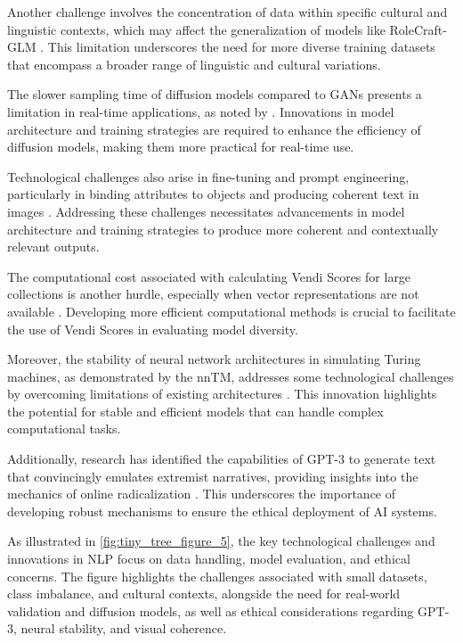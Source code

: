 Another challenge involves the concentration of data within specific cultural and linguistic contexts, which may affect the generalization of models like RoleCraft-GLM \cite{tao2024rolecraftglmadvancingpersonalizedroleplaying}. This limitation underscores the need for more diverse training datasets that encompass a broader range of linguistic and cultural variations.

The slower sampling time of diffusion models compared to GANs presents a limitation in real-time applications, as noted by \cite{dhariwal2021diffusion}. Innovations in model architecture and training strategies are required to enhance the efficiency of diffusion models, making them more practical for real-time use.

Technological challenges also arise in fine-tuning and prompt engineering, particularly in binding attributes to objects and producing coherent text in images \cite{liu2024visual}. Addressing these challenges necessitates advancements in model architecture and training strategies to produce more coherent and contextually relevant outputs.

The computational cost associated with calculating Vendi Scores for large collections is another hurdle, especially when vector representations are not available \cite{pasarkar2024cousinsvendiscorefamily}. Developing more efficient computational methods is crucial to facilitate the use of Vendi Scores in evaluating model diversity.

Moreover, the stability of neural network architectures in simulating Turing machines, as demonstrated by the nnTM, addresses some technological challenges by overcoming limitations of existing architectures \cite{stogin2022provablystableneuralnetwork}. This innovation highlights the potential for stable and efficient models that can handle complex computational tasks.

Additionally, research has identified the capabilities of GPT-3 to generate text that convincingly emulates extremist narratives, providing insights into the mechanics of online radicalization \cite{mcguffie2020radicalizationrisksgpt3advanced}. This underscores the importance of developing robust mechanisms to ensure the ethical deployment of AI systems.

As illustrated in \autoref{fig:tiny_tree_figure_5}, the key technological challenges and innovations in NLP focus on data handling, model evaluation, and ethical concerns. The figure highlights the challenges associated with small datasets, class imbalance, and cultural contexts, alongside the need for real-world validation and diffusion models, as well as ethical considerations regarding GPT-3, neural stability, and visual coherence.

